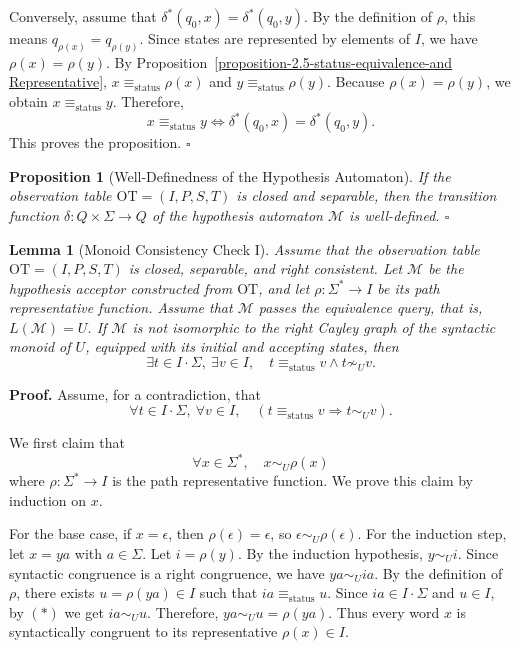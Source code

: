 \documentclass{ieice-tecrep}
\newtheorem{proposition}{Proposition}
\newtheorem{lemma}{Lemma}
\begin{document}
Conversely, assume that \(\delta^*(q_0,x)=\delta^*(q_0,y)\). By the definition of \(\rho\), this means \(q_{\rho(x)}=q_{\rho(y)}\). Since states are represented by elements of \(I\), we have \(\rho(x)=\rho(y)\). By Proposition~\ref{proposition-2.5-status-equivalence-and Representative}, \(x\equiv_{\mathrm{status}}\rho(x)\) and \(y\equiv_{\mathrm{status}}\rho(y)\). Because \(\rho(x)=\rho(y)\), we obtain \(x\equiv_{\mathrm{status}}y\). Therefore,
\[
x\equiv_{\mathrm{status}}y
\Longleftrightarrow
\delta^*(q_0,x)=\delta^*(q_0,y).
\]
This proves the proposition. \hfill $\square$

\begin{proposition}[Well-Definedness of the Hypothesis Automaton]\label{proposition-3-well-definedness-of-the-hypothesis-automaton}
If the observation table \(\mathrm{OT}=(I,P,S,T)\) is closed and separable, 
then the transition function \(\delta:Q\times\Sigma\to Q\) of the hypothesis automaton \(\mathcal{M}\) is well-defined. \hfill $\square$
\end{proposition}


\begin{lemma}[Monoid Consistency Check I]\label{lemma-monoid-consistency-check-i}
Assume that the observation table \(\mathrm{OT}=(I,P,S,T)\) is closed,
separable, and right consistent. Let \(\mathcal{M}\) be the
hypothesis acceptor constructed from \(\mathrm{OT}\), and let
\(\rho:\Sigma^*\to I\) be its path representative function.
Assume that \(\mathcal{M}\) passes the equivalence query, that is,
\(L(\mathcal{M})=U\). If \(\mathcal{M}\) is not isomorphic to the
right Cayley graph of the syntactic monoid of \(U\), equipped with
its initial and accepting states, then
\[
\exists t \in I \cdot \Sigma,\ \exists v \in I,\quad
t \equiv_{\mathrm{status}} v \land t \not\sim_U v.
\]
\end{lemma}
\noindent\textbf{Proof.} Assume, for a contradiction, that
\[
\forall t \in I\cdot\Sigma,\ \forall v\in I,\quad
(t\equiv_{\mathrm{status}}v \Longrightarrow t\sim_U v).
\tag{*}
\]

We first claim that
\[
\forall x\in\Sigma^*,\quad x\sim_U\rho(x)
\]
where \(\rho:\Sigma^*\to I\) is the path representative function. We prove this claim by induction on \(x\).

For the base case, if \(x=\epsilon\), then \(\rho(\epsilon)=\epsilon\),
so \(\epsilon\sim_U\rho(\epsilon)\). For the induction step, let \(x=ya\) with \(a\in\Sigma\). Let \(i=\rho(y)\). By the induction hypothesis, \(y\sim_U i\). Since syntactic congruence is a right congruence, we have \(ya\sim_U ia\). By the definition of \(\rho\), there exists \(u=\rho(ya)\in I\) such
that \(ia\equiv_{\mathrm{status}}u\). Since \(ia\in I\cdot\Sigma\) and \(u\in I\), by \((*)\) we get \(ia\sim_U u\). Therefore, \(ya \sim_U u=\rho(ya)\). Thus every word \(x\) is syntactically congruent to its representative
\(\rho(x)\in I\).
\end{document}

